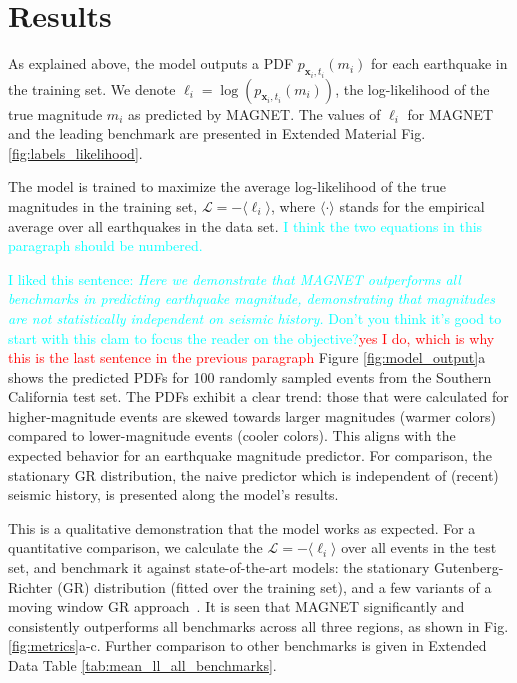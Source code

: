 \documentclass[pdflatex]{sn-jnl}
\newcommand{\yohai}[1]{{\textcolor{red}{#1}}}
\newcommand{\neri}[1]{{\textcolor{cyan}{#1}}}
\begin{document}
\section{Results} \label{sec:results}
As explained above, the model outputs a PDF $p_{\textbf{x}_i, t_i}(m_i)$ for each earthquake in the training set. We denote $\ell_i=\log\left(p_{\textbf{x}_i, t_i}(m_i)\right)$, the log-likelihood of the true magnitude $m_i$ as predicted by MAGNET.  The values of $\ell_i$ for MAGNET and the leading benchmark are presented in Extended Material Fig. \ref{fig:labels_likelihood}.

The model is trained to maximize the average log-likelihood of the true magnitudes in the training set, $\mathcal{L} = -\langle \ell_i \rangle$, where $\langle \cdot\rangle$ stands for the empirical average over all earthquakes in the data set. \neri{I think the two equations in this paragraph should be numbered.}

\neri{I liked this sentence: \textit{Here we demonstrate that MAGNET outperforms all benchmarks in predicting earthquake magnitude, demonstrating that magnitudes are not statistically independent on seismic history.} Don't you think it's good to start with this clam to focus the reader on the objective?}\yohai{yes I do, which is why this is the last sentence in the previous paragraph}
Figure \ref{fig:model_output}a shows the predicted PDFs for 100 randomly sampled events from the Southern California test set. The PDFs exhibit a clear trend: those that were calculated for higher-magnitude events are skewed towards larger magnitudes (warmer colors) compared to lower-magnitude events (cooler colors). This aligns with the expected behavior for an earthquake magnitude predictor. For comparison, the stationary GR distribution, the naive predictor which is independent of (recent) seismic history, is presented along the model's results.

This is a qualitative demonstration that the model works as expected. For a quantitative comparison, we calculate the $\mathcal{L}=-\langle \ell_i \rangle$ over all events in the test set, and benchmark it against state-of-the-art models:
the stationary Gutenberg-Richter (GR) distribution (fitted over the training set), and a few variants of a moving window GR approach~\cite{gulia_real-time_2019}. It is seen that MAGNET significantly and consistently outperforms all benchmarks across all three regions, as shown in Fig. \ref{fig:metrics}a-c. Further comparison to other benchmarks is given in Extended Data Table \ref{tab:mean_ll_all_benchmarks}.
\end{document}
